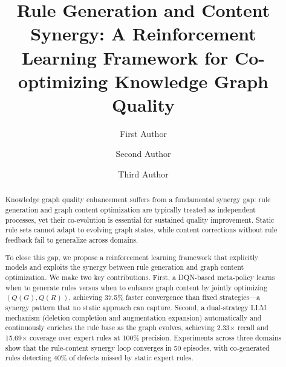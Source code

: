\documentclass[runningheads]{llncs}
\begin{document}
\title{Rule Generation and Content Synergy: A Reinforcement Learning Framework for Co-optimizing Knowledge Graph Quality}


\author{First Author \and
Second Author \and
Third Author}



\maketitle

\begin{abstract}
Knowledge graph quality enhancement suffers from a fundamental synergy gap: rule generation and graph content optimization are typically treated as independent processes, yet their co-evolution is essential for sustained quality improvement. Static rule sets cannot adapt to evolving graph states, while content corrections without rule feedback fail to generalize across domains. %

To close this gap, we propose a reinforcement learning framework that explicitly models and exploits the synergy between rule generation and graph content optimization. We make two key contributions. First, a DQN-based meta-policy learns when to generate rules versus when to enhance graph content by jointly optimizing $(Q(G), Q(R))$, achieving 37.5\% faster convergence than fixed strategies—a synergy pattern that no static approach can capture. Second, a dual-strategy LLM mechanism (deletion completion and augmentation expansion) automatically and continuously enriches the rule base as the graph evolves, achieving 2.33$\times$ recall and 15.69$\times$ coverage over expert rules at 100\% precision. Experiments across three domains show that the rule-content synergy loop converges in 50 episodes, with co-generated rules detecting 40\% of defects missed by static expert rules.

\end{abstract}
\end{document}
